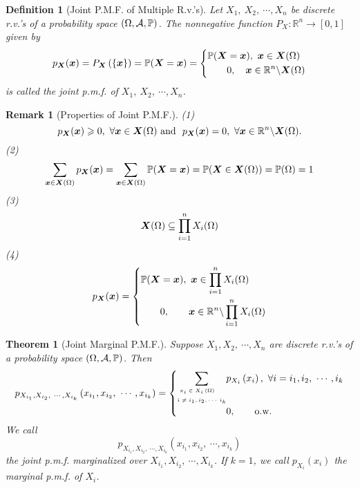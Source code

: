 \documentclass[openany,12pt]{book}
\newtheorem{theorem}{Theorem}[chapter]
\newtheorem{remark}{Remark}[chapter]
\newtheorem{definition}{Definition}[chapter]
\begin{document}
\begin{definition}[Joint P.M.F. of Multiple R.v.'s]
Let $X_1,\ X_2,\ \cdots,X_n$ be discrete r.v.'s of a probability space $(\Omega,\mathcal{A},\mathbb{P})$. The nonnegative function $P_X:\mathbb{R}^n\to[0,1]$ given by 
\[p_{\bm{X}}(\bm{x}) = P_{\bm{X}}\left( \left\{ \bm{x}\right\} \right) = \mathbb{P}(\bm{X} =\bm{x} ) = \left\{ \begin{aligned}
&\mathbb{P}(\bm{X} =\bm{x} ),\ \bm{x}\in\bm{X}(\Omega) \\
&\qquad0,\quad\bm{x}\in \mathbb{R}^{n}\backslash\bm{X}(\Omega) \\
\end{aligned} \right.\]
is called the joint p.m.f. of $X_1,\ X_2,\ \cdots,X_n$.
\end{definition}

\begin{remark}[Properties of Joint P.M.F.]
(1)
\[p_{\bm{X}}(\bm{x}) \geqslant 0,\ \forall \bm{x}\in \bm{X}( \Omega )\ \mathrm{\text{and}}\mathrm{\ }\ p_{\bm{X}}(\bm{x}) = 0,\ \forall\bm{x} \in \mathbb{R}^{n}\backslash \bm{X}(\Omega).\]
(2)
\[\sum_{\bm{x}\in \bm{X}(\Omega)}{p_{\bm{X}}(\bm{x})} = \sum_{\bm{x}\in \bm{X}(\Omega)}{\mathbb{P}(\bm{X}=\bm{x})} = \mathbb{P}(\bm{X} \in \bm{X}(\Omega) ) = \mathbb{P}( \Omega ) = 1\]
(3)
\[\bm{X}(\Omega) \subseteq \prod_{i = 1}^{n}{X_{i}(\Omega)}\]
(4)
\[p_{\bm{X}}(\bm{x}) = \left\{ \begin{aligned}
&\mathbb{P}(\bm{X} =\bm{x}),\ \bm{x}\in\prod_{i = 1}^{n}X_{i}(\Omega) \\
&\qquad0,\qquad\bm{x}  \in \mathbb{R}^{n}\backslash\prod_{i = 1}^{n}X_{i}( \Omega) \\
\end{aligned} \right.\]
\end{remark}

\begin{theorem}[Joint Marginal P.M.F.]
Suppose $X_1,X_2,\ \cdots,X_n$ are discrete r.v.'s of a probability space $(\Omega,\mathcal{A},\mathbb{P})$. Then 
\[p_{X_{i_{1}},X_{i_{2}},\ \cdots,X_{i_{k}}}\left( x_{i_{1}},x_{i_{2}},\ \cdots,x_{i_{k}} \right) = \left\{ \begin{aligned}
\sum_{\mbox{\tiny$\begin{aligned}
&x_{i} \in X_{i}\left( \Omega \right) \\
i &\neq i_{1},i_{2},\cdots\,i_{k} \\
\end{aligned}$}} & {p_{X_i}\left( x_i \right),\ \forall i = i_{1},i_{2},\ \cdots,i_{k}} \\
&0,\qquad\mathrm{\text{o.w.}} \\
\end{aligned} \right.\]
We call $$p_{X_{i_1},X_{i_2},\ \cdots,X_{i_k}}\left(x_{i_1},x_{i_2},\ \cdots,x_{i_k}\right)$$ the joint p.m.f. marginalized over $X_{i_1},X_{i_2},\ \cdots,X_{i_k}$.  If $k=1$, we call $p_{X_i}(x_i)$ the marginal p.m.f. of $X_i$.
\end{theorem}
\end{document}
